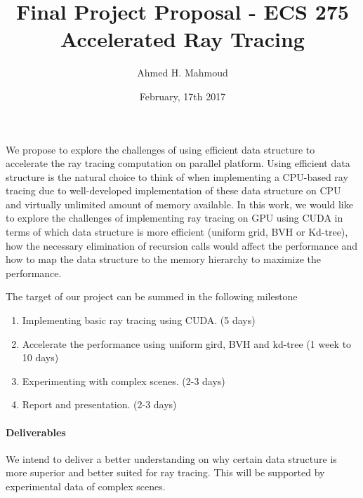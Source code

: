\documentclass[12pt] {article}
\begin{document}
\title{Final Project Proposal - ECS 275\\
\vspace{2mm}
Accelerated Ray Tracing}

\author{ Ahmed H. Mahmoud}
\date{February, 17th 2017} 
\maketitle

We propose to explore the challenges of using efficient data structure to accelerate the ray tracing computation on parallel platform. Using efficient data structure is the natural choice to think of when implementing a CPU-based ray tracing due to well-developed implementation of these data structure on CPU and virtually unlimited amount of memory available. In this work, we would like to explore the challenges of implementing ray tracing on GPU using CUDA in terms of which data structure is more efficient (uniform grid, BVH or Kd-tree), how the necessary elimination of recursion calls would affect the performance and how to map the data structure to the memory hierarchy to maximize the performance. 


The target of our project can be summed in the following milestone 
\begin{enumerate}
\item Implementing basic ray tracing using CUDA. (5 days)
\item Accelerate the performance using uniform gird, BVH and kd-tree (1 week to 10 days)
\item Experimenting with complex scenes. (2-3 days)
\item Report and presentation. (2-3 days)
\end{enumerate}

\paragraph{Deliverables} We intend to deliver a better understanding on why certain data structure is more superior and better suited for ray tracing. This will be supported by experimental data of complex scenes.






\end{document}
